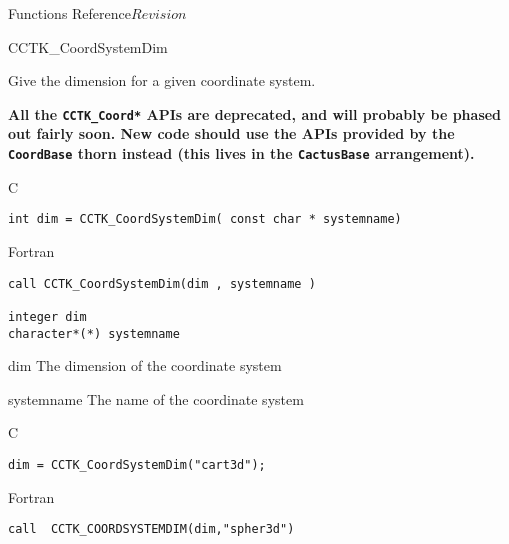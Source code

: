 \begin{cactuspart}{ Functions Reference}{}{$Revision$}

\begin{FunctionDescription}{CCTK\_CoordSystemDim}%
{Give the dimension for a given coordinate system.

\textbf{All the \texttt{CCTK\_Coord*} APIs are deprecated,
and will probably be phased out fairly soon.
New code should use the APIs provided by the \texttt{CoordBase} thorn
instead (this lives in the \texttt{CactusBase} arrangement).}
}
\label{CCTK-CoordDim}
\begin{SynopsisSection}
\begin{Synopsis}{C}
\begin{verbatim}int dim = CCTK_CoordSystemDim( const char * systemname)\end{verbatim}
\end{Synopsis}
\begin{Synopsis}{Fortran}
\begin{verbatim}call CCTK_CoordSystemDim(dim , systemname )

integer dim
character*(*) systemname \end{verbatim}
\end{Synopsis}
\end{SynopsisSection}
\begin{ParameterSection}
\begin{Parameter}{dim}
The dimension of the coordinate system
\end{Parameter}
\begin{Parameter}{systemname}
The name of the coordinate system
\end{Parameter}
\end{ParameterSection}

\begin{ExampleSection}
\begin{Example}{C}
\begin{verbatim}
dim = CCTK_CoordSystemDim("cart3d");
\end{verbatim}
\end{Example}
\begin{Example}{Fortran}
\begin{verbatim}
call  CCTK_COORDSYSTEMDIM(dim,"spher3d")
\end{verbatim}
\end{Example}
\end{ExampleSection}
\end{FunctionDescription}



\end{cactuspart}
